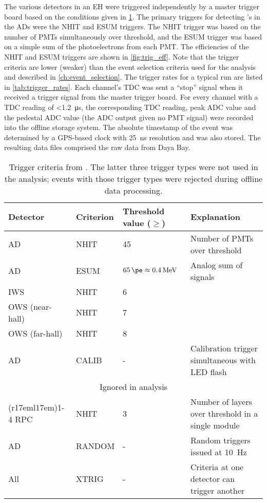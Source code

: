 The various detectors in an EH were triggered independently
by a master trigger board based on the conditions given in \cref{tab:trigger}.
The primary triggers for detecting \nuebar{}'s in the ADs were the NHIT and ESUM triggers.
The NHIT trigger was based on the number of PMTs simultaneously over threshold,
and the ESUM trigger was based on a simple sum of the photoelectrons
from each PMT.
The efficiencies of the NHIT and ESUM triggers are shown in \cref{fig:trig_eff}.
Note that the trigger criteria are lower (weaker) than the event selection
criteria used for the \thetaot{} analysis and described in \cref{ch:event_selection}.
The trigger rates for a typical run are listed in \cref{tab:trigger_rates}.
Each channel's TDC was sent a ``stop'' signal when it received a trigger signal
from the master trigger board.
For every channel with a TDC reading of \SI{<1.2}{\us},
the corresponding TDC reading, peak ADC value and the pedestal ADC value
(the ADC output given no PMT signal)
were recorded into the offline storage system.
The absolute timestamp of the event was determined by a GPS-based clock
with \SI{25}{\ns} resolution and was also stored.
The resulting data files comprised the raw data from Daya Bay.

\begin{table}[ht]
    \centering
    \begin{tabular}[t]{lllp{6cm}}
        \toprule
        Detector & Criterion & Threshold value ($\geq$) & Explanation\\
        \midrule
        AD & NHIT & \num{45} & Number of PMTs over threshold \\
        AD & ESUM & $\SI{65}{\pe}\approx \SI{0.4}{\MeV}$ & Analog sum of signals \\
        IWS & NHIT & \num{6} & \\
        OWS (near-hall) & NHIT & \num{7} & \\
        OWS (far-hall) & NHIT & \num{8} & \\
        AD & CALIB & - & Calibration trigger simultaneous with LED flash \\
        \midrule
        \multicolumn{4}{c}{Ignored in \thetaot{} analysis} \\
        \cmidrule(r{17em}l{17em}){1-4}
        RPC & NHIT & \num{3} & Number of layers over threshold in a single module \\
        AD & RANDOM & - & Random triggers issued at \SI{10}{\Hz} \\
        All & XTRIG & - & Criteria at one detector can trigger another \\
        \bottomrule
    \end{tabular}
    \caption[Trigger criteria]{
        Trigger criteria from \cite{ngd2016}.
        The latter three trigger types were not used in the \thetaot{} analysis;
        events with those trigger types were rejected
        during offline data processing.
    }
    \label{tab:trigger}
\end{table}

